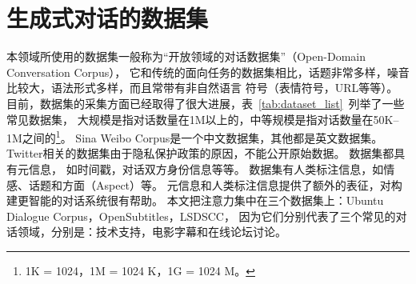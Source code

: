 \section{生成式对话的数据集}\label{sec:public_dataset}
本领域所使用的数据集一般称为“开放领域的对话数据集”（Open-Domain Conversation Corpus），
它和传统的面向任务的数据集相比，话题非常多样，噪音比较大，语法形式多样，而且常带有非自然语言
符号（表情符号，URL等等）。
目前，数据集的采集方面已经取得了很大进展，表~\ref{tab:dataset_list}~列举了一些常见数据集，
大规模是指对话数量在1M以上的，中等规模是指对话数量在50K--1M之间的\footnote{1K = 1024，1M = 1024 K，1G = 1024 M。}。
Sina Weibo Corpus是一个中文数据集，其他都是英文数据集。
Twitter相关的数据集由于隐私保护政策的原因，不能公开原始数据。
数据集\cite{supreme,wiki_pages,tennis_corpus,parliamentary,gone_awry,movie_dialogs_corpus,DailyDialog}都具有元信息，
如时间戳，对话双方身份信息等等。
数据集\cite{DailyDialog,LSDSCC,DCGM}有人类标注信息，如情感、话题和方面（Aspect）等。
元信息和人类标注信息提供了额外的表征，对构建更智能的对话系统很有帮助。
本文把注意力集中在三个数据集上：Ubuntu Dialogue Corpus，OpenSubtitles，LSDSCC，
因为它们分别代表了三个常见的对话领域，分别是：技术支持，电影字幕和在线论坛讨论。


